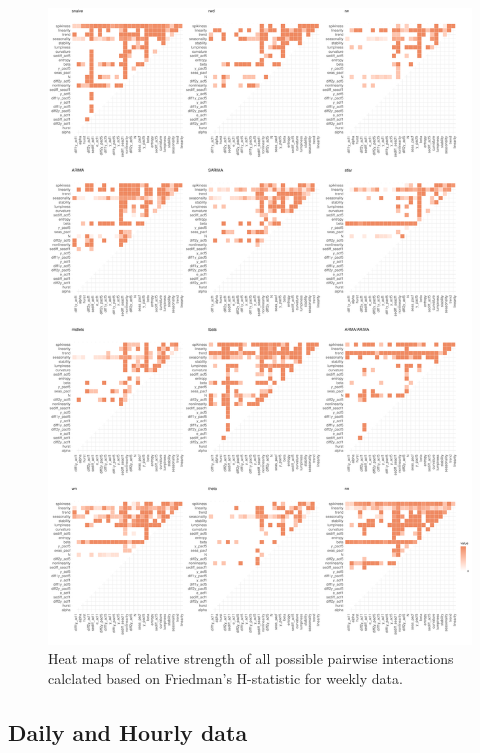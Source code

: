 \documentclass[11pt,a4paper,]{article}
\begin{document}
\begin{figure}
\centering
\includegraphics{figures/friedmanHW-1.pdf}
\caption{\label{fig:friedmanHW}Heat maps of relative strength of all
possible pairwise interactions calclated based on Friedman's H-statistic
for weekly data.}
\end{figure}

\newpage

\subsection{Daily and Hourly data}\label{daily-and-hourly-data}
\end{document}
